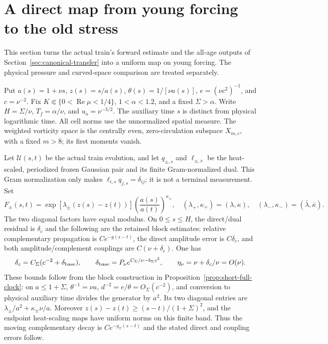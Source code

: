 \section{A direct map from young forcing to the old stress}
\label{sec:young-old-direct}

This section turns the actual train's forward estimate and the
all-age outputs of Section~\ref{sec:canonical-transfer} into a
uniform map on young forcing. The physical pressure and curved-space
comparison are treated separately.

Put $a(s)=1+\nu s$, $z(s)=s/a(s)$,
$\theta(s)=1/[\nu a(s)]$, $e=(\nu c^2)^{-1}$, and $c=\nu^{-2}$.
Fix $K\Subset\{0<\operatorname{Re}\mu<1/4\}$, $1<\alpha<1.2$,
and a fixed $\Sigma>\alpha$.
Write $H=\Sigma/\nu$, $T_f=\alpha/\nu$, and
$u_o=\nu^{-3/2}$. The auxiliary time $s$ is distinct from physical
logarithmic time. All cell norms use the unnormalized spatial measure.
The weighted vorticity space is the centrally even, zero-circulation
subspace $X_{m,c}$, with a fixed $m>8$; its first moments vanish.

Let $\mathcal U(s,t)$ be the actual train evolution, and let
$q_{\pm,s}$ and $\ell_{\pm,s}$ be the heat-scaled, periodized frozen
Gaussian pair and its finite Gram-normalized dual. This Gram normalization
only makes $\ell_{i,s}q_{j,s}=\delta_{ij}$; it is not a terminal
measurement. Set
\[
 F_\pm(s,t)=
 \exp\!\left[\lambda_\pm(z(s)-z(t))\right]
 \left(\frac{a(s)}{a(t)}\right)^{\kappa_\pm},
 \quad(\lambda_+,\kappa_+)=(\lambda,\kappa),
 \quad(\lambda_-,\kappa_-)=(\bar\lambda,\bar\kappa).
\]
The two diagonal factors have equal modulus. On $0\le s\le H$,
the direct/dual residual is $\delta_c$ and the following are the
retained block estimates: relative complementary propagation is
$Ce^{-g(s-t)}$, the direct amplitude error is $C\delta_c$, and both
amplitude/complement couplings are $C(\nu+\delta_c)$. One has
\[
 \delta_c=C_\Sigma(c^{-2}+\delta_{\rm base}),\qquad
 \delta_{\rm base}=P_\nu e^{C_\Sigma/\nu-b_\Sigma c^2},\qquad
 \eta_\nu=\nu+\delta_c/\nu=O(\nu).
\]
These bounds follow from the block construction in
Proposition~\ref{prop:short-full-clock}: on $a\le1+\Sigma$,
$\theta^{-1}=\nu a$, $d^{-2}=e/\theta=O_\Sigma(c^{-2})$,
and conversion to physical auxiliary time divides the generator by
$a^2$. Its two diagonal entries are
$\lambda_\pm/a^2+\kappa_\pm\nu/a$. Moreover
$z(s)-z(t)\ge(s-t)/(1+\Sigma)^2$, and the endpoint heat-scaling
maps have uniform norms on this finite band. Thus the moving
complementary decay is $Ce^{-g_\Sigma(s-t)}$ and the stated
direct and coupling errors follow.

